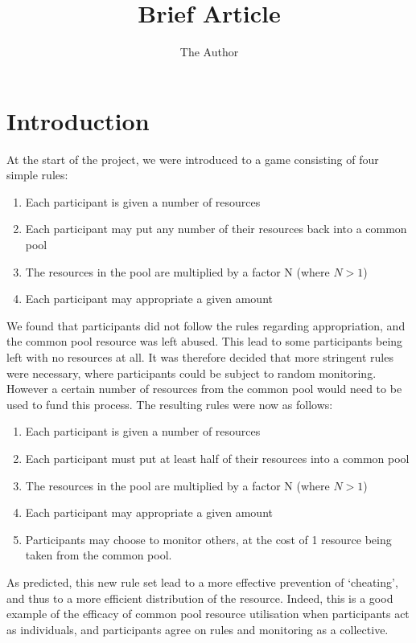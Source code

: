 \documentclass[]{article} %
\title{Brief Article}
\author{The Author}
\begin{document}
\maketitle

\section{Introduction}

At the start of the project, we were introduced to a game consisting of four simple rules:

\begin{enumerate}
\item Each participant is given a number of resources
\item Each participant may put any number of their resources back into a common pool
\item	The resources in the pool are multiplied by a factor N (where $N > 1$)
\item	Each participant may appropriate a given amount
\end{enumerate}

We found that participants did not follow the rules regarding appropriation, and the common pool resource was left abused. This lead to some participants being left with no resources at all. It was therefore decided that more stringent rules were necessary, where participants could be subject to random monitoring. However a certain number of resources from the common pool would need to be used to fund this process. The resulting rules were now as follows:

\begin{enumerate}
	\item Each participant is given a number of resources
	\item Each participant must put at least half of their resources into a common pool
	\item The resources in the pool are multiplied by a factor N (where  $N > 1$)
	\item Each participant may appropriate a given amount
	\item  Participants may choose to monitor others, at the cost of 1 resource being taken from the common pool.
\end{enumerate}

As predicted, this new rule set lead to a more effective prevention of ‘cheating’, and thus to a more efficient distribution of the resource. Indeed, this is a good example of the efficacy of common pool resource utilisation when participants act as individuals, and participants agree on rules and monitoring as a collective.
\end{document}
